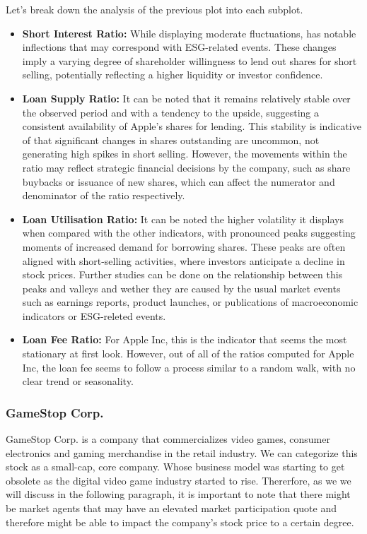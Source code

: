 Let's break down the analysis of the previous plot into each subplot.

\begin{itemize}
	\item\textbf{Short Interest Ratio:} While displaying moderate fluctuations, has notable inflections that may correspond with ESG-related events. These changes imply a varying degree of shareholder willingness to lend out shares for short selling, potentially reflecting a higher liquidity or investor confidence.
	\item\textbf{Loan Supply Ratio:} It can be noted that it remains relatively stable over the observed period and with a tendency to the upside, suggesting a consistent availability of Apple's shares for lending. This stability is indicative of that significant changes in shares outstanding are uncommon, not generating high spikes in short selling. However, the movements within the ratio may reflect strategic financial decisions by the company, such as share buybacks or issuance of new shares, which can affect the numerator and denominator of the ratio respectively.
	\item\textbf{Loan Utilisation Ratio:} It can be noted the higher volatility it displays when compared with the other indicators, with pronounced peaks suggesting moments of increased demand for borrowing shares. These peaks are often aligned with short-selling activities, where investors anticipate a decline in stock prices. Further studies can be done on the relationship between this peaks and valleys and wether they are caused by the usual market events such as earnings reports, product launches, or publications of macroeconomic indicators or ESG-releted events.
	\item\textbf{Loan Fee Ratio:} For Apple Inc, this is the indicator that seems the most stationary at first look. However, out of all of the ratios computed for Apple Inc, the loan fee seems to follow a process similar to a random walk, with no clear trend or seasonality.
\end{itemize}


\subsubsection{GameStop Corp.}

GameStop Corp. is a company that commercializes video games, consumer electronics and gaming merchandise in the retail industry. We can categorize this stock as a small-cap, core company. Whose business model was starting to get obsolete as the digital video game industry started to rise. Thererfore, as we we will discuss in the following paragraph, it is important to note that there might be market agents that may have an elevated market participation quote and therefore might be able to impact the company's stock price to a certain degree.

